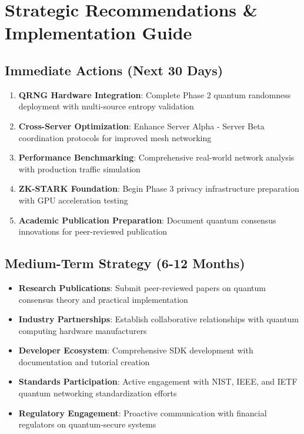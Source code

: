 \documentclass[11pt,a4paper]{article}
\begin{document}
\section{Strategic Recommendations \& Implementation Guide}

\subsection{Immediate Actions (Next 30 Days)}

\begin{enumerate}
\item \textbf{QRNG Hardware Integration}: Complete Phase 2 quantum randomness deployment with multi-source entropy validation
\item \textbf{Cross-Server Optimization}: Enhance Server Alpha - Server Beta coordination protocols for improved mesh networking
\item \textbf{Performance Benchmarking}: Comprehensive real-world network analysis with production traffic simulation
\item \textbf{ZK-STARK Foundation}: Begin Phase 3 privacy infrastructure preparation with GPU acceleration testing
\item \textbf{Academic Publication Preparation}: Document quantum consensus innovations for peer-reviewed publication
\end{enumerate}

\subsection{Medium-Term Strategy (6-12 Months)}

\begin{itemize}
\item \textbf{Research Publications}: Submit peer-reviewed papers on quantum consensus theory and practical implementation
\item \textbf{Industry Partnerships}: Establish collaborative relationships with quantum computing hardware manufacturers
\item \textbf{Developer Ecosystem}: Comprehensive SDK development with documentation and tutorial creation
\item \textbf{Standards Participation}: Active engagement with NIST, IEEE, and IETF quantum networking standardization efforts
\item \textbf{Regulatory Engagement}: Proactive communication with financial regulators on quantum-secure systems
\end{itemize}
\end{document}
